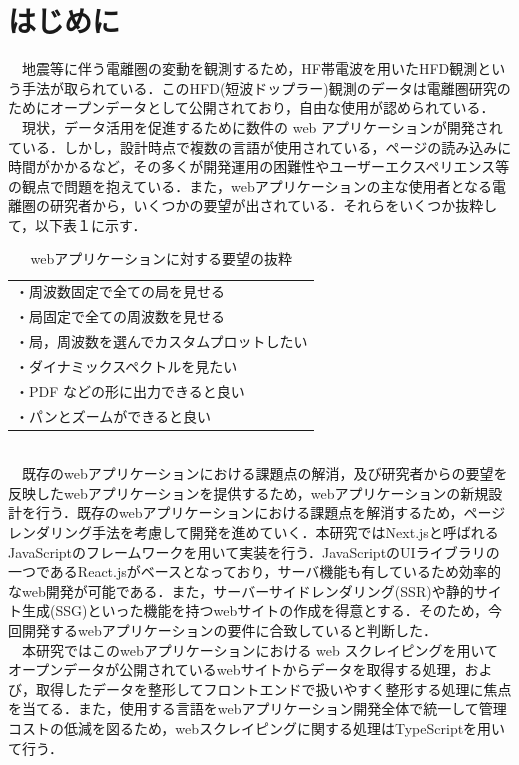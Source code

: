 \section{はじめに}

　地震等に伴う電離圏の変動を観測するため，HF帯電波を用いたHFD観測という手法が取られている．このHFD(短波ドップラー)観測のデータは電離圏研究のためにオープンデータとして公開されており，自由な使用が認められている．\cite{hfd_report}\\
　現状，データ活用を促進するために数件の web アプリケーションが開発されている．しかし，設計時点で複数の言語が使用されている，ページの読み込みに時間がかかるなど，その多くが開発運用の困難性やユーザーエクスペリエンス等の観点で問題を抱えている．また，webアプリケーションの主な使用者となる電離圏の研究者から，いくつかの要望が出されている．それらをいくつか抜粋して，以下表１に示す．\\
\begin{table}[h]
  \centering
  \caption{webアプリケーションに対する要望の抜粋}
  \label{tab:requst}
  \begin{tabular}{l}
  \toprule
     ・周波数固定で全ての局を見せる\\
    ・局固定で全ての周波数を見せる\\
    ・局，周波数を選んでカスタムプロットしたい\\
    ・ダイナミックスペクトルを見たい\\
    ・PDF などの形に出力できると良い\\
    ・パンとズームができると良い
  \end{tabular}
\end{table}\\
　既存のwebアプリケーションにおける課題点の解消，及び研究者からの要望を反映したwebアプリケーションを提供するため，webアプリケーションの新規設計を行う．既存のwebアプリケーションにおける課題点を解消するため，ページレンダリング手法を考慮して開発を進めていく．本研究ではNext.jsと呼ばれるJavaScriptのフレームワークを用いて実装を行う．JavaScriptのUIライブラリの一つであるReact.jsがベースとなっており，サーバ機能も有しているため効率的なweb開発が可能である．また，サーバーサイドレンダリング(SSR)や静的サイト生成(SSG)といった機能を持つwebサイトの作成を得意とする．そのため，今回開発するwebアプリケーションの要件に合致していると判断した．\cite{next}\\
　本研究ではこのwebアプリケーションにおける web スクレイピングを用いてオープンデータが公開されているwebサイトからデータを取得する処理，および，取得したデータを整形してフロントエンドで扱いやすく整形する処理に焦点を当てる．また，使用する言語をwebアプリケーション開発全体で統一して管理コストの低減を図るため，webスクレイピングに関する処理はTypeScriptを用いて行う．\\
